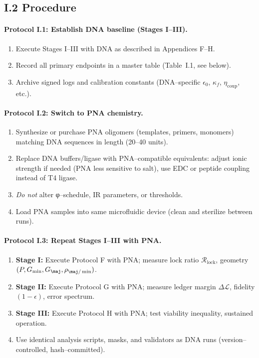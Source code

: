 \documentclass[11pt]{article}
\begin{document}
\subsection*{I.2 Procedure}

\paragraph{Protocol I.1: Establish DNA baseline (Stages I–III).}
\begin{enumerate}
\item Execute Stages I–III with DNA as described in Appendices F–H.
\item Record all primary endpoints in a master table (Table~I.1, see below).
\item Archive signed logs and calibration constants (DNA–specific $\epsilon_0$, $\kappa_f$, $\eta_{\mathrm{coup}}$, etc.).
\end{enumerate}

\paragraph{Protocol I.2: Switch to PNA chemistry.}
\begin{enumerate}
\item Synthesize or purchase PNA oligomers (templates, primers, monomers) matching DNA sequences in length (20–40 units).
\item Replace DNA buffers/ligase with PNA–compatible equivalents: adjust ionic strength if needed (PNA less sensitive to salt), use EDC or peptide coupling instead of T4 ligase.
\item \emph{Do not} alter φ–schedule, IR parameters, or thresholds.
\item Load PNA samples into same microfluidic device (clean and sterilize between runs).
\end{enumerate}

\paragraph{Protocol I.3: Repeat Stages I–III with PNA.}
\begin{enumerate}
\item \textbf{Stage I:} Execute Protocol F with PNA; measure lock ratio $\mathcal{R}_{\mathrm{lock}}$, geometry $(P,G_{\min},G_{\maj},\rho_{\maj/\min})$.
\item \textbf{Stage II:} Execute Protocol G with PNA; measure ledger margin $\Delta\mathcal{L}$, fidelity $(1-\epsilon)$, error spectrum.
\item \textbf{Stage III:} Execute Protocol H with PNA; test viability inequality, sustained operation.
\item Use identical analysis scripts, masks, and validators as DNA runs (version–controlled, hash–committed).
\end{enumerate}
\end{document}
